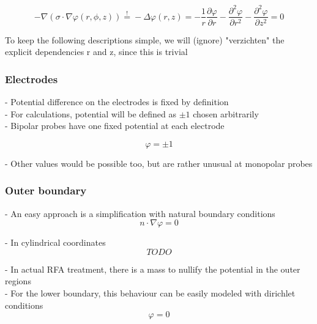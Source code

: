 \documentclass[parskip=half, titlepage=yes, 12pt, BCOR=12mm, DIV=calc]{scrartcl}
\begin{document}
\begin{equation}
    - \nabla  ( \sigma \cdot \nabla \varphi(r,\phi,z)) \overset{!}{=} - \Delta \varphi(r,z) = - \frac{1}{r} \frac{\partial \varphi}{\partial r} - \frac{\partial^2 \varphi}{\partial r^2} - \frac{\partial^2 \varphi}{\partial z^2} = 0
\end{equation}

To keep the following descriptions simple, we will (ignore) "verzichten" the explicit dependencies r and z, since this is trivial

\subsubsection{Electrodes}

- Potential difference on the electrodes is fixed by definition \\
- For calculations, potential will be defined as $\pm 1$ chosen arbitrarily \\
- Bipolar probes have one fixed potential at each electrode

\begin{equation}
    \varphi = \pm 1
\end{equation}

- Other values would be possible too, but are rather unusual at monopolar probes \\

\subsubsection{Outer boundary}

- An easy approach is a simplification with natural boundary conditions \\

\begin{equation}
    n \cdot \nabla \varphi = 0
\end{equation}

- In cylindrical coordinates
\begin{equation}
    TODO
\end{equation}

- In actual RFA treatment, there is a mass to nullify the potential in the outer regions \\
- For the lower boundary, this behaviour can be easily modeled with dirichlet conditions \\
\begin{equation}
    \varphi = 0
\end{equation}
\end{document}
